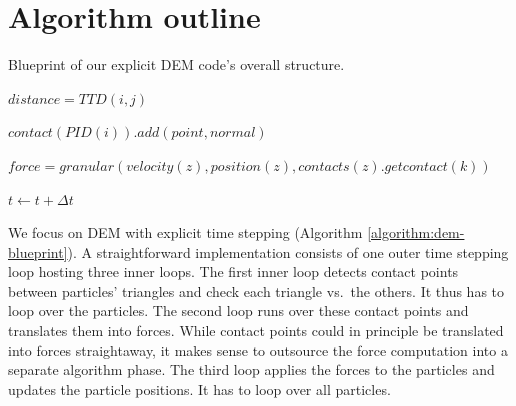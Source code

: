 \section{Algorithm outline}
\label{section:algorithm}
 

\begin{algorithm}
 
   Blueprint of our explicit DEM code's overall structure.
 
 \label{algorithm:dem-blueprint}
 \begin{algorithmic}[1]
   

				
			\State $distance = TTD(i,j)$
				

				\State $contact(PID(i)).add(point, normal)$

			\EndIf
			
		\EndFor
			
	\EndFor




			\State $force = granular(velocity(z), position(z), contacts(z).getcontact(k))$

		\EndFor
	
	\EndFor    
    
     \State $t \gets t + \Delta t$
   \EndFor   

 \end{algorithmic}
\end{algorithm} 


We focus on DEM with explicit time stepping (Algorithm \ref{algorithm:dem-blueprint}). 
A straightforward implementation consists of one outer time stepping loop
hosting three inner loops. 
The first inner loop detects contact points between particles' triangles and
check each triangle vs.~the others.
It thus has to loop over the particles.
The second loop runs over these contact points and translates them into forces.
While contact points could in principle be translated into forces straightaway,
it makes sense to outsource the force computation into a separate algorithm
phase.
The third loop applies the forces to the particles and updates the particle
positions.
It has to loop over all particles.


